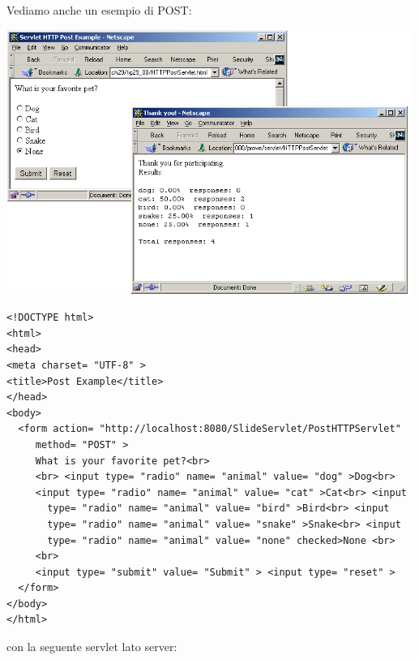 \documentclass[a4paper,12pt, oneside]{book}
\begin{document}
\newpage
Vediamo anche un esempio di POST:
\begin{center}
	\includegraphics[scale=0.7]{img/post.png}
\end{center}
\begin{verbatim}
<!DOCTYPE html>
<html>
<head>
<meta charset= "UTF-8" >
<title>Post Example</title>
</head>
<body>
  <form action= "http://localhost:8080/SlideServlet/PostHTTPServlet"
     method= "POST" >
     What is your favorite pet?<br>
     <br> <input type= "radio" name= "animal" value= "dog" >Dog<br>
     <input type= "radio" name= "animal" value= "cat" >Cat<br> <input
       type= "radio" name= "animal" value= "bird" >Bird<br> <input
       type= "radio" name= "animal" value= "snake" >Snake<br> <input
       type= "radio" name= "animal" value= "none" checked>None <br>
     <br>
     <input type= "submit" value= "Submit" > <input type= "reset" >
  </form>
</body>
</html> 
\end{verbatim}
con la seguente servlet lato server:
\end{document}
